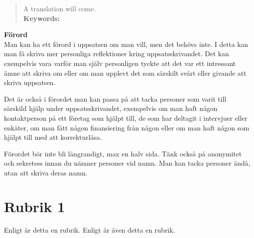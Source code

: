 \documentclass[a4paper,12pt]{article} %
\begin{document}
\begin{abstract}
\noindent A translation will come.\\

\noindent\textbf{Keywords:}
\end{abstract}

\newpage

\textbf{\large{Förord}}\\

Man kan ha ett förord i uppsatsen om man vill, men det behövs inte. I detta kan man få skriva mer personliga reflektioner kring uppsatsskrivandet. Det kan exempelvis vara varför man själv personligen tyckte att det var ett intressant ämne att skriva om eller om man upplevt det som särskilt svårt eller givande att skriva uppsatsen.

Det är också i förordet man kan passa på att tacka personer som varit till särskild hjälp under uppsatsskrivandet, exempelvis om man haft någon kontaktperson på ett företag som hjälpt till, de som har deltagit i intervjuer eller enkäter, om man fått någon finansiering från någon eller om man haft någon som hjälpt till med att korrekturläsa.

Förordet bör inte bli långrandigt, max en halv sida. Tänk också på anonymitet och sekretess innan du nämner personer vid namn. Man kan tacka personer ändå, utan att skriva deras namn.

\newpage

\tableofcontents %

\newpage %

\section{Rubrik 1}
Enligt \cite{small} är detta en rubrik. Enligt \cite{big} är även detta en rubrik.
\end{document}
